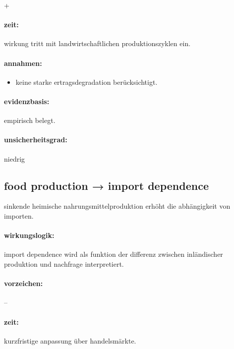 \documentclass[11pt, a4paper, oneside]{scrartcl}
\begin{document}
+

\paragraph{zeit:} 

wirkung tritt mit landwirtschaftlichen produktionszyklen ein.

\paragraph{annahmen:}
\begin{itemize}
\item keine starke ertragsdegradation berücksichtigt.
\end{itemize}

\paragraph{evidenzbasis:}

empirisch belegt.

\paragraph{unsicherheitsgrad:} 

niedrig

\subsection{food production → import dependence}
sinkende heimische nahrungsmittelproduktion erhöht die abhängigkeit von importen.

\paragraph{wirkungslogik:}

import dependence wird als funktion der differenz zwischen inländischer produktion und nachfrage interpretiert.

\paragraph{vorzeichen:}

--

\paragraph{zeit:} 

kurzfristige anpassung über handelsmärkte.
\end{document}
